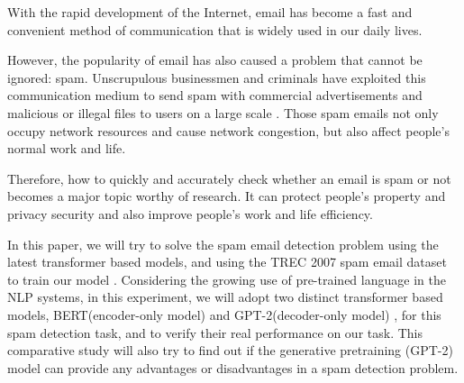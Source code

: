 With the rapid development of the Internet, email has become a fast and convenient method of communication that is widely used in our daily lives. 

However, the popularity of email has also caused a problem that cannot be ignored: spam. Unscrupulous businessmen and criminals have exploited this communication medium to send spam with commercial advertisements and malicious or illegal files to users on a large scale \cite {kumar_email_2020}. Those spam emails not only occupy network resources and cause network congestion, but also affect people's normal work and life.

Therefore, how to quickly and accurately check whether an email is spam or not 
becomes a major topic worthy of research. It can protect people's property and 
privacy security and also improve people's work and life efficiency. 

In this paper, we will try to solve the spam email detection problem using the latest transformer based models, and using the TREC 2007 spam email dataset to train our model \cite{trecspam2007}.
Considering the growing use of pre-trained language in the NLP systems, in this experiment, we will adopt two distinct transformer based models, BERT(encoder-only model) \cite{devlin2018bert} and GPT-2(decoder-only model) \cite{radford2019language}, for this spam detection task, and to verify their real performance on our task. 
This comparative study will also try to find out if the generative pretraining (GPT-2) model can provide any advantages or disadvantages in a spam detection problem.